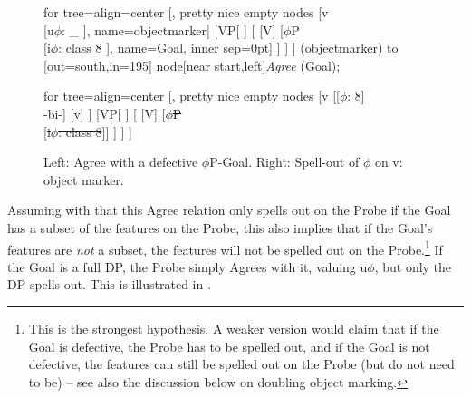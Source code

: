 \documentclass[output=paper
,modfonts
,nonflat]{langsci/langscibook}
\begin{document}
\begin{figure}
	\caption{Left: Agree with a defective $\phi$P-Goal. Right: Spell-out of $\phi$ on v: object marker.\label{fig-vdwal:13}\label{fig-vdwal:12}}
\begin{minipage}{.5\textwidth}\centering
{}
		\begin{forest} for tree={align=center}
			[, pretty nice empty nodes
			[v\\{[}u$\phi$: \_ {]}, name=objectmarker]
			[VP[ ]
			[
			[V]  
			[$\phi$P\\{[}i$\phi$: class 8 {]}, name=Goal, inner sep=0pt]
			] ] ]				
			 (objectmarker) to [out=south,in=195] node[near start,left]{\textit{Agree}} (Goal);			
	\end{forest}
	\end{minipage}\begin{minipage}{.5\textwidth}\centering
{}
		\begin{forest} for tree={align=center}
			[, pretty nice empty nodes
			[v [{[}$\phi$: 8{]}\\-bi-] 
			[v] ]
			[VP[ ]
			[
			[V]  
			[\sout{$\phi$P}\\ {[}\sout{i$\phi$: class 8}{]}]
			] ] ]				
		\end{forest}
\end{minipage} 
\end{figure}

\noindent Assuming with \citet{Roberts2010} that this Agree relation only spells out on the Probe if the Goal has a subset of the features on the Probe, this also implies that if the Goal’s features are \textit{not} a subset, the features will not be spelled out on the Probe.\footnote{This is the strongest hypothesis. A weaker version would claim that if the Goal is defective, the Probe has to be spelled out, and if the Goal is not defective, the features can still be spelled out on the Probe (but do not need to be) -- see also the discussion below on doubling object marking.} If the Goal is a full DP, the Probe simply Agrees with it, valuing u$\phi$, but only the DP spells out. This is illustrated in .\largerpage
\end{document}
